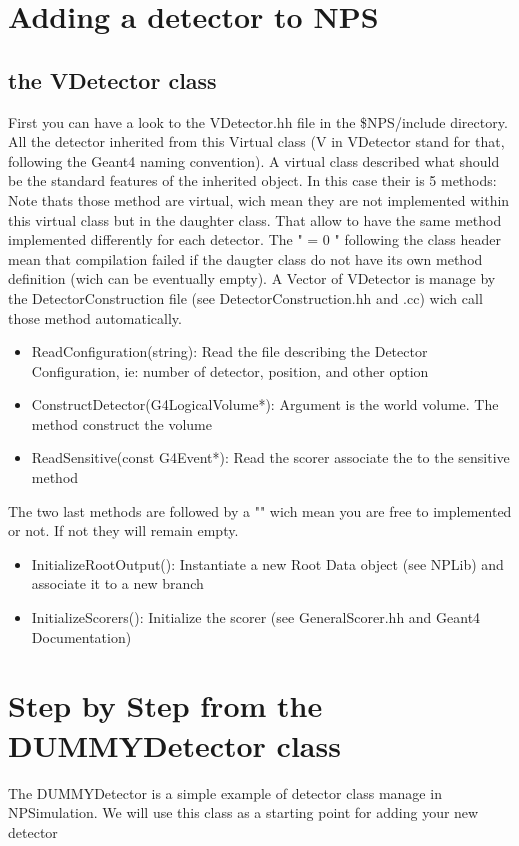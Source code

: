\documentclass{book}
\begin{document}
\section{ Adding a detector to NPS }

\subsection{ the VDetector class}

First you can have a look to the VDetector.hh file in the \$NPS/include directory. 
All the detector inherited from this Virtual class (V in VDetector stand for that, following the Geant4 naming convention). 
A virtual class described what should be the standard features of the inherited object. 
In this case their is 5 methods: Note thats those method are virtual, wich mean they are not implemented within this virtual class but in the daughter class. 
That allow to have the same method implemented differently for each detector. 
The " = 0 " following the class header mean that compilation failed if the daugter class do not have its own method definition (wich can be eventually empty).
A Vector of VDetector is manage by the DetectorConstruction file (see DetectorConstruction.hh and .cc) wich call those method automatically.

	\begin{itemize}
		\item[] ReadConfiguration(string): Read the file describing the Detector Configuration, ie: number of detector, position, and other option
		\item[] ConstructDetector(G4LogicalVolume*): Argument is the world volume. The method construct the volume
		\item[] ReadSensitive(const G4Event*): Read the scorer associate the to the sensitive method
	\end{itemize}
	
The two last methods are followed by a "{}" wich mean you are free to implemented or not. 
If not they will remain empty.
	\begin{itemize}
		\item[] InitializeRootOutput(): Instantiate a new Root Data object (see NPLib) and associate it to a new branch
		\item[] InitializeScorers(): Initialize the scorer (see GeneralScorer.hh and Geant4 Documentation)
	\end{itemize}

\section{ Step by Step from the DUMMYDetector class}
	The DUMMYDetector is a simple example of detector class manage in NPSimulation. 
	We will use this class as a starting point for adding your new detector
\end{document}
